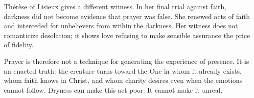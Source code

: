 Thérèse of Lisieux gives a different witness. In her final trial against faith, darkness did not become evidence that prayer was false. She renewed acts of faith and interceded for unbelievers from within the darkness. Her witness does not romanticize desolation; it shows love refusing to make sensible assurance the price of fidelity.

Prayer is therefore not a technique for generating the experience of presence. It is an enacted truth: the creature turns toward the One in whom it already exists, whom faith knows in Christ, and whom charity desires even when the emotions cannot follow. Dryness can make this act poor. It cannot make it unreal.
